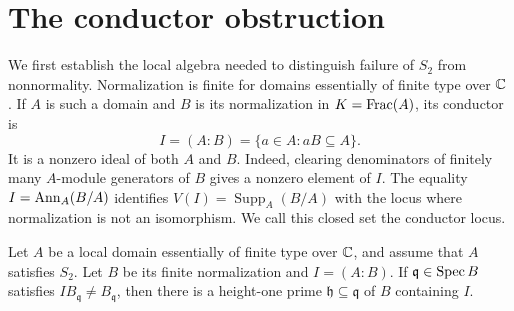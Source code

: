 \section{The conductor obstruction}\label{sec:conductor}

We first establish the local algebra needed to distinguish failure of
$S_2$ from nonnormality. Normalization is finite for domains essentially
of finite type over $\mathbb C$ \cite[Tags~035B and~035S]{stacks-project}.
If $A$ is such a domain and $B$ is its
normalization in $K=\operatorname{Frac}(A)$, its conductor is
\begin{equation}\label{eq:conductor}
 I=(A:B)=\{a\in A:aB\subseteq A\}.
\end{equation}
It is a nonzero ideal of both $A$ and $B$. Indeed, clearing denominators
of finitely many $A$-module generators of $B$ gives a nonzero element
of $I$. The equality $I=\operatorname{Ann}_A(B/A)$ identifies
$V(I)=\operatorname{Supp}_A(B/A)$ with the locus where normalization
is not an isomorphism. We call this closed set the conductor locus.

\begin{lemma}\label{lem:conductor}
Let $A$ be a local domain essentially of finite type over $\mathbb C$,
and assume that $A$ satisfies $S_2$. Let $B$ be its finite normalization
and $I=(A:B)$. If $\mathfrak q\in\operatorname{Spec} B$ satisfies
$I B_{\mathfrak q}\neq B_{\mathfrak q}$, then there is a height-one
prime $\mathfrak h\subseteq\mathfrak q$ of $B$ containing $I$.
\end{lemma}

